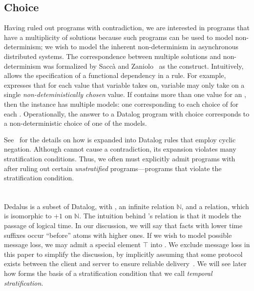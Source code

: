 \subsection{Choice}

Having ruled out programs with contradiction, we are interested in programs
that have a multiplicity of solutions because such programs can be used to
model non-determinism; we wish to model the inherent non-determinism in
asynchronous distributed systems.  The correspondence between multiple
solutions and non-determinism was formalized by Sacc\`{a} and
Zaniolo~\cite{sacca-zaniolo} as the  construct.  Intuitively,
 allows the specification of a functional dependency in a rule.
For example,  expresses that for
each value that variable  takes on, variable  may only
take on a single {\em non-deteministically chosen} value. If 
contains more than one  value for an , then the instance
has multiple models: one corresponding to each choice of  for each
.  Operationally, the answer to a Datalog program with choice
corresponds to a non-deterministic choice of one of the models.

See~\cite{sacca-zaniolo} for the details on how  is expanded
into Datalog rules that employ cyclic negation.  Although 
cannot cause a contradiction, its expansion violates many stratification
conditions.  Thus, we often must explicitly admit programs with 
after ruling out certain {\em unstratified} programs---programs that violate
the stratification condition.

\section{\lang}

Dedalus is a subset of Datalog, with , an infinite
 relation $\mathbb{N}$, and a 
relation, which is isomorphic to $+1$ on $\mathbb{N}$.  The intuition behind
\lang's  relation is that it models the passage of logical
time.  In our discussion, we will say that facts with lower time suffixes occur
``before'' atoms with higher ones.  If we wish to model possible message loss,
we may admit a special element $\top$ into .  We exclude message
loss in this paper to simplify the discussion, by implicitly assuming that some
protocol exists between the client and server to ensure reliable delivery~\cite{dedalus-techr, netdb}.
We will see later how  forms the basis of a stratification
condition that we call {\em temporal stratification}.

